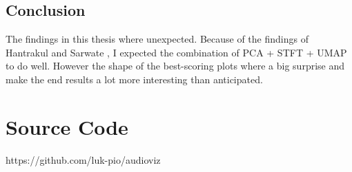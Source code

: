 \documentclass[a4paper, 12pt, twoside]{report}
\begin{document}
\section{Conclusion}
\label{sec:orgf2b4e9e}

The findings in this thesis where unexpected. Because of the findings of Hantrakul and Sarwate \cite{klustr}, I expected the combination of PCA + STFT + UMAP to do well. However the shape of the best-scoring plots where a big surprise and make the end results a lot more interesting than anticipated.




\appendix
\appendixpage
\addappheadtotoc

\chapter{Source Code}
https://github.com/luk-pio/audioviz
\end{document}
